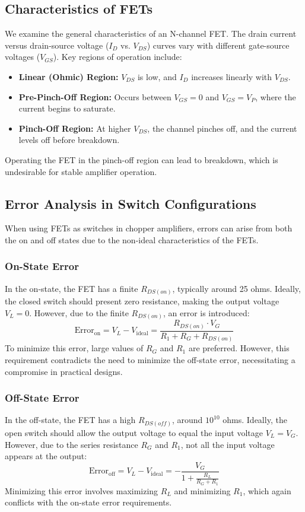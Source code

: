 \subsection*{Characteristics of FETs}
We examine the general characteristics of an N-channel FET. The drain current versus drain-source voltage (\( I_D \) vs. \( V_{DS} \)) curves vary with different gate-source voltages (\( V_{GS} \)). Key regions of operation include:
\begin{itemize}
    \item \textbf{Linear (Ohmic) Region:} \( V_{DS} \) is low, and \( I_D \) increases linearly with \( V_{DS} \).
    \item \textbf{Pre-Pinch-Off Region:} Occurs between \( V_{GS} = 0 \) and \( V_{GS} = V_P \), where the current begins to saturate.
    \item \textbf{Pinch-Off Region:} At higher \( V_{DS} \), the channel pinches off, and the current levels off before breakdown.
\end{itemize}
Operating the FET in the pinch-off region can lead to breakdown, which is undesirable for stable amplifier operation.

\subsection*{Error Analysis in Switch Configurations}
When using FETs as switches in chopper amplifiers, errors can arise from both the on and off states due to the non-ideal characteristics of the FETs.

\subsubsection*{On-State Error}
In the on-state, the FET has a finite \( R_{DS(on)} \), typically around 25 ohms. Ideally, the closed switch should present zero resistance, making the output voltage \( V_L = 0 \). However, due to the finite \( R_{DS(on)} \), an error is introduced:
\[
\text{Error}_{\text{on}} = V_L - V_{\text{ideal}} = \frac{R_{DS(on)} \cdot V_G}{R_1 + R_G + R_{DS(on)}}
\]
To minimize this error, large values of \( R_G \) and \( R_1 \) are preferred. However, this requirement contradicts the need to minimize the off-state error, necessitating a compromise in practical designs.

\subsubsection*{Off-State Error}
In the off-state, the FET has a high \( R_{DS(off)} \), around \( 10^{10} \) ohms. Ideally, the open switch should allow the output voltage to equal the input voltage \( V_L = V_G \). However, due to the series resistance \( R_G \) and \( R_1 \), not all the input voltage appears at the output:
\[
\text{Error}_{\text{off}} = V_L - V_{\text{ideal}} = -\frac{V_G}{1 + \frac{R_L}{R_G + R_1}}
\]
Minimizing this error involves maximizing \( R_L \) and minimizing \( R_1 \), which again conflicts with the on-state error requirements.

